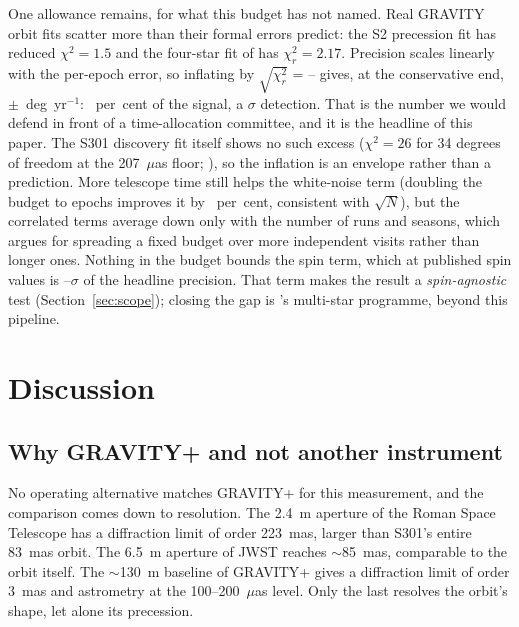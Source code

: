 \documentclass{aastex701}
\begin{document}
One allowance remains, for what this budget has not named. Real GRAVITY orbit fits scatter more than their formal errors predict: the S2 precession fit has reduced $\chi^2 = 1.5$ \citep{gravity2020} and the four-star fit of \citet{gravity2022massdist} has $\chi^2_r = 2.17$. Precision scales linearly with the per-epoch error, so inflating by $\sqrt{\chi^2_r}$ = \budgetInflationLow{}--\budgetInflationHigh{} gives, at the conservative end, $\pm$\budgetBottomLineInflated{}~deg~yr$^{-1}$: \budgetBottomLineInflatedPctOfSignal{}~per~cent of the signal, a \budgetBottomLineInflatedDetectionNsigma{}$\sigma$ detection. That is the number we would defend in front of a time-allocation committee, and it is the headline of this paper. The S301 discovery fit itself shows no such excess ($\chi^2 = 26$ for 34 degrees of freedom at the 207~$\mu$as floor; \citealt{gravity2026}), so the inflation is an envelope rather than a prediction. More telescope time still helps the white-noise term (doubling the budget to \cadenceDoubledN{} epochs improves it by \cadenceDoubledPctGain{}~per~cent, consistent with $\sqrt{N}$), but the correlated terms average down only with the number of runs and seasons, which argues for spreading a fixed budget over more independent visits rather than longer ones. Nothing in the budget bounds the spin term, which at published spin values is \budgetSpinNsigmaHeadlineLow{}--\budgetSpinNsigmaHeadlineHigh{}$\sigma$ of the headline precision. That term makes the result a \emph{spin-agnostic} test (Section~\ref{sec:scope}); closing the gap is \citet{piran2026}'s multi-star programme, beyond this pipeline.

\section{Discussion}
\label{sec:discussion}

\subsection{Why GRAVITY+ and not another instrument}

No operating alternative matches GRAVITY+ for this measurement, and the comparison comes down to resolution. The 2.4~m aperture of the Roman Space Telescope has a diffraction limit of order 223~mas, larger than S301's entire 83~mas orbit. The 6.5~m aperture of JWST reaches $\sim$85~mas, comparable to the orbit itself. The $\sim$130~m baseline of GRAVITY+ gives a diffraction limit of order 3~mas and astrometry at the 100--200~$\mu$as level. Only the last resolves the orbit's shape, let alone its precession.
\end{document}
